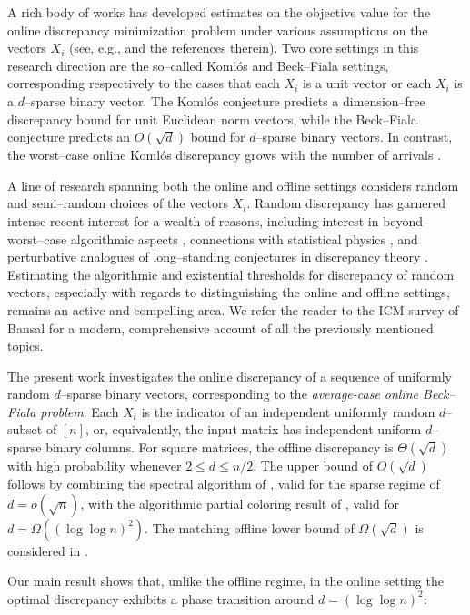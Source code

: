 \documentclass[reqno,english]{amsart}
\theoremstyle{definition}
\begin{document}
A rich body of works has developed estimates on the objective value for the online discrepancy minimization problem under various assumptions on the vectors $X_i$ (see, e.g., \cite{self-balancing,bansal-survey,bansal-online,optimal-online} and the references therein). Two core settings in this research direction are the so--called Koml\'os and Beck--Fiala settings, corresponding respectively to the cases that each $X_i$ is a unit vector or each $X_i$ is a $d$--sparse binary vector. The Koml\'os conjecture predicts a dimension--free discrepancy bound for unit Euclidean norm vectors, while the Beck--Fiala conjecture predicts an $O(\sqrt d)$ bound for $d$--sparse binary vectors. In contrast, the worst--case online Koml\'os discrepancy grows with the number of arrivals \cite{optimal-online}.

A line of research spanning both the online and offline settings considers random and semi--random choices of the vectors $X_i$. Random discrepancy has garnered intense recent interest for a wealth of reasons, including interest in beyond--worst--case algorithmic aspects \cite{bansal-smooth1,bansal-smooth2}, connections with statistical physics \cite{APZ}, and perturbative analogues of long--standing conjectures in discrepancy theory \cite{bansal-smooth2}. Estimating the algorithmic and existential thresholds for discrepancy of random vectors, especially with regards to distinguishing the online and offline settings, remains an active and compelling area. We refer the reader to the ICM survey of Bansal \cite{bansal-survey} for a modern, comprehensive account of all the previously mentioned topics. 

The present work investigates the online discrepancy of a sequence of uniformly random $d$--sparse binary vectors, corresponding to the {\it average-case online Beck--Fiala problem}.  Each $X_t$ is the
indicator of an independent uniformly random $d$--subset of $[n]$, or,
equivalently, the input matrix has independent uniform $d$--sparse binary
columns. For square matrices, the offline discrepancy is $\Theta(\sqrt d)$
with high probability whenever $2\leq d\leq n/2$.  The upper bound of $O(\sqrt{d})$ follows by
combining the spectral algorithm of 
\cite{potukuchi-spectral}, valid for the sparse regime of $d=o(\sqrt n)$,
with the algorithmic partial coloring result of \cite{bansal-meka}, valid for
$d=\Omega((\log\log n)^2)$. The matching offline lower bound of $\Omega(\sqrt{d})$ is 
considered in \cite{random-hypergraph-discrepancy}. 

Our main result shows that, unlike the offline regime,
in the online setting the optimal discrepancy exhibits a phase transition around $d=(\log\log n)^2$:
\end{document}
